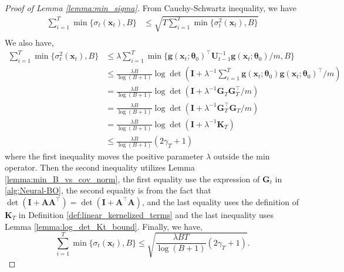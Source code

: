 \begin{proof}[Proof of Lemma \ref{lemma:min_sigma}]
From Cauchy-Schwartz inequality, we have 
\begin{equation*}
    \begin{split}
        \sum_{i=1}^T \min \{\sigma_t(\mathbf{x}_t), B\} & \leq \sqrt{T \sum_{i=1}^T \min \{\sigma_t^2(\mathbf{x}_t), B\}} \\
    \end{split}
\end{equation*}
We also have, 
\begin{equation*}
    \begin{split}
        \sum_{i=1}^T \min \{\sigma_t^2 (\mathbf{x}_t), B\} & \leq \lambda \sum_{i=1}^T \min \{ \mathbf{g}(\mathbf{x}_t;\boldsymbol{\theta}_0)^\top \mathbf{U}^{-1}_{t-1} \mathbf{g}(\mathbf{x}_t;\boldsymbol{\theta}_0)/m,B \} 
        \\
        & \leq \frac{\lambda B}{\log(B+1)}  \log \det (\mathbf{I} + \lambda^{-1} \sum_{i=1}^T \mathbf{g}(\mathbf{x}_t;\boldsymbol{\theta}_0) \mathbf{g}(\mathbf{x}_t;\boldsymbol{\theta}_0)^\top /m) \\
        & = \frac{\lambda B}{\log(B+1)}  \log \det (\mathbf{I}  + \lambda^{-1} \mathbf{G}_T \mathbf{G}_T^\top /m ) \\
        & = \frac{\lambda B}{\log(B+1)}\log \det (\mathbf{I}  + \lambda^{-1} \mathbf{G}_T^\top \mathbf{G}_T /m ) \\
        & = \frac{\lambda B}{\log(B+1)} \log \det (\mathbf{I}  + \lambda^{-1} \mathbf{K}_T)\\
        & \leq  \frac{\lambda B}{\log(B+1)} (2\gamma_T+1)
    \end{split}
\end{equation*}
where the first inequality moves the positive parameter $\lambda$ outside the min operator. Then the second inequality utilizes Lemma \ref{lemma:min_B_vs_cov_norm}, the first equality use the expression of $\mathbf{G}_t$ in \ref{alg:Neural-BO}, the second equality is from the fact that $\det(\mathbf{I} + \mathbf{A}\mathbf{A}^\top) = \det(\mathbf{I} + \mathbf{A}^\top\mathbf{A})$, and the last equality uses the definition of $\mathbf{K}_T$ in Definition \ref{def:linear_kernelized_terms} and the last inequality uses Lemma \ref{lemma:log_det_Kt_bound}. Finally, we have, 
\[
\sum_{i=1}^T \min \{\sigma_t(\mathbf{x}_t), B\} \leq \sqrt{\frac{\lambda BT}{\log(B+1)} (2\gamma_T+1)}.
\]
\end{proof}


